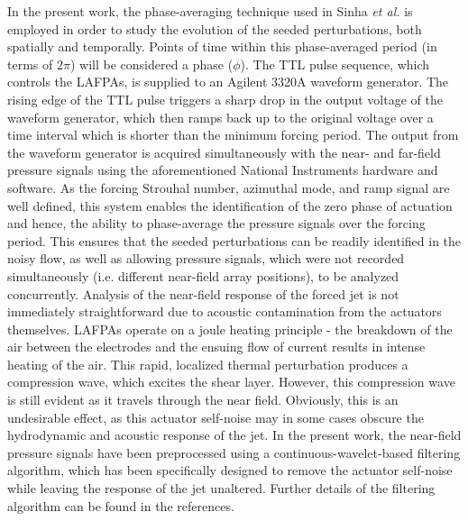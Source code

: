 \documentclass[english]{aiaa-tc}
\begin{document}
In the present work, the phase-averaging technique used in Sinha {\em et al.}\cite{sinha2013} is employed in order to study the evolution of the seeded perturbations, both spatially and temporally. Points of time within this phase-averaged period (in terms of $2\pi$) will be considered a phase ($\phi$). The TTL pulse sequence, which controls the LAFPAs, is supplied to an Agilent 3320A waveform generator. The rising edge of the TTL pulse triggers a sharp drop in the output voltage of the waveform generator, which then ramps back up to the original voltage over a time interval which is shorter than the minimum forcing period. The output from the waveform generator is acquired simultaneously with the near- and far-field pressure signals using the aforementioned National Instruments hardware and software. As the forcing Strouhal number, azimuthal mode, and ramp signal are well defined, this system enables the identification of the zero phase of actuation and hence, the ability to phase-average the pressure signals over the forcing period. This ensures that the seeded perturbations can be readily identified in the noisy flow, as well as allowing pressure signals, which were not recorded simultaneously (i.e. different near-field array positions), to be analyzed concurrently. 
Analysis of the near-field response of the forced jet is not immediately straightforward due to acoustic contamination from the actuators themselves\cite{sinha2013}. LAFPAs operate on a joule heating principle - the breakdown of the air between the electrodes and the ensuing flow of current results in intense heating of the air. This rapid, localized thermal perturbation produces a compression wave, which excites the shear layer. However, this compression wave is still evident as it travels through the near field. Obviously, this is an undesirable effect, as this actuator self-noise may in some cases obscure the hydrodynamic and acoustic response of the jet. In the present work, the near-field pressure signals have been preprocessed using a continuous-wavelet-based filtering algorithm, which has been specifically designed to remove the actuator self-noise while leaving the response of the jet unaltered. Further details of the filtering algorithm can be found in the references\cite{Alkandry2013}. 
\end{document}
